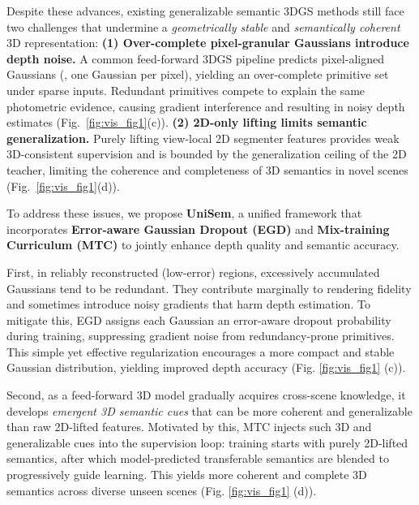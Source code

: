 \documentclass[runningheads]{llncs}
\begin{document}
Despite these advances, existing generalizable semantic 3DGS methods still face two challenges that undermine a \emph{geometrically stable} and \emph{semantically coherent} 3D representation: 
\textbf{(1) Over-complete pixel-granular Gaussians introduce depth noise.}
A common feed-forward 3DGS pipeline predicts pixel-aligned Gaussians (\ie, one Gaussian per pixel), yielding an over-complete primitive set under sparse inputs.
Redundant primitives compete to explain the same photometric evidence, causing gradient interference and resulting in noisy depth estimates (Fig.~\ref{fig:vis_fig1}(c)).
\textbf{(2) 2D-only lifting limits semantic generalization.} 
Purely lifting view-local 2D segmenter features provides weak 3D-consistent supervision and is bounded by the generalization ceiling of the 2D teacher, limiting the coherence and completeness of 3D semantics in novel scenes (Fig.~\ref{fig:vis_fig1}(d)). 


To address these issues, we propose \textbf{UniSem}, a unified framework that incorporates \textbf{Error-aware Gaussian Dropout (EGD)} and \textbf{Mix-training Curriculum (MTC)} to jointly enhance depth quality and semantic accuracy. 


First, in reliably reconstructed (low-error) regions, excessively accumulated Gaussians tend to be redundant. They contribute marginally to rendering fidelity and sometimes introduce noisy gradients that harm depth estimation.
To mitigate this, EGD assigns each Gaussian an error-aware dropout probability during training, suppressing gradient noise from redundancy-prone primitives. 
This simple yet effective regularization encourages a more compact and stable Gaussian distribution, yielding improved depth accuracy (Fig. \ref{fig:vis_fig1} (c)). 


Second, as a feed-forward 3D model gradually acquires cross-scene knowledge, it develops \textit{emergent 3D semantic cues} that can be more coherent and generalizable than raw 2D-lifted features. 
Motivated by this, MTC injects such 3D and generalizable cues into the supervision loop: training starts with purely 2D-lifted semantics, after which model-predicted transferable semantics are blended to progressively guide learning. 
This yields more coherent and complete 3D semantics across diverse unseen scenes (Fig. \ref{fig:vis_fig1} (d)). 
\end{document}
